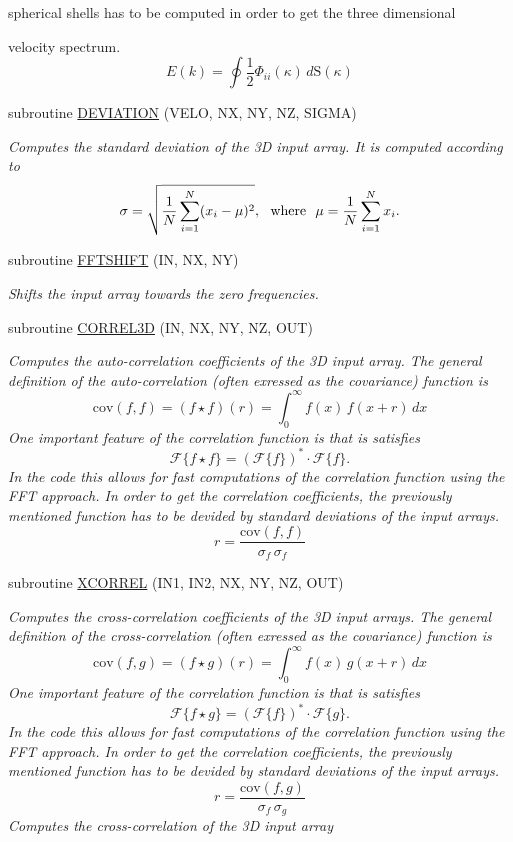 \begin{DoxyCompactItemize}
\begin{DoxyCompactList}
 spherical shells has to be computed in order to get the three dimensional\par
 velocity spectrum. \[ E(k)=\oint\frac{1}{2}\Phi_{ii}(\kappa)\,d\mathrm{S}(\kappa) \] \end{DoxyCompactList}\item 
subroutine \hyperlink{namespaceSTATISTICS_a96f2830bd74ef7e612bb9b567a488fcb}{DEVIATION} (VELO, NX, NY, NZ, SIGMA)
\begin{DoxyCompactList}\small\item\em Computes the standard deviation of the 3D input array. It is computed according to \[\sigma = \sqrt{\frac{1}{N} \sum_{i=1}^N (x_i - \mu)^2}, {\rm \ \ where\ \ } \mu = \frac{1}{N} \sum_{i=1}^N x_i. \] \end{DoxyCompactList}\item 
subroutine \hyperlink{namespaceSTATISTICS_ac51d5b789da17893b95107ddcb97813f}{FFTSHIFT} (IN, NX, NY)
\begin{DoxyCompactList}\small\item\em Shifts the input array towards the zero frequencies. \end{DoxyCompactList}\item 
subroutine \hyperlink{namespaceSTATISTICS_a6631e38a843e8bfa986d426daebd6f4c}{CORREL3D} (IN, NX, NY, NZ, OUT)
\begin{DoxyCompactList}\small\item\em Computes the auto-\/correlation coefficients of the 3D input array. The general definition of the auto-\/correlation (often exressed as the covariance) function is \[\mathrm{cov}(f,f)=\left(f\star f\right)(r)=\int_0^{\infty}f(x)\,f(x+r)\,dx \] One important feature of the correlation function is that is satisfies \[\mathcal{F}\{f\star f\}=(\mathcal{F}\{f\})^*\cdot\mathcal{F}\{f\}. \] In the code this allows for fast computations of the correlation function using the FFT approach. In order to get the correlation coefficients, the previously mentioned function has to be devided by standard deviations of the input arrays. \[r=\frac{\mathrm{cov}(f,f)}{\sigma_f\,\sigma_f} \] \end{DoxyCompactList}\item 
subroutine \hyperlink{namespaceSTATISTICS_a2529efc59bb06c5f2280df7277bf5c7d}{XCORREL} (IN1, IN2, NX, NY, NZ, OUT)
\begin{DoxyCompactList}\small\item\em Computes the cross-\/correlation coefficients of the 3D input arrays. The general definition of the cross-\/correlation (often exressed as the covariance) function is \[\mathrm{cov}(f,g)=\left(f\star g\right)(r)=\int_0^{\infty}f(x)\,g(x+r)\,dx \] One important feature of the correlation function is that is satisfies \[\mathcal{F}\{f\star g\}=(\mathcal{F}\{f\})^*\cdot\mathcal{F}\{g\}. \] In the code this allows for fast computations of the correlation function using the FFT approach. In order to get the correlation coefficients, the previously mentioned function has to be devided by standard deviations of the input arrays. \[r=\frac{\mathrm{cov}(f,g)}{\sigma_f\,\sigma_g} \] Computes the cross-\/correlation of the 3D input array \end{DoxyCompactList}\item 

\end{DoxyCompactItemize}
